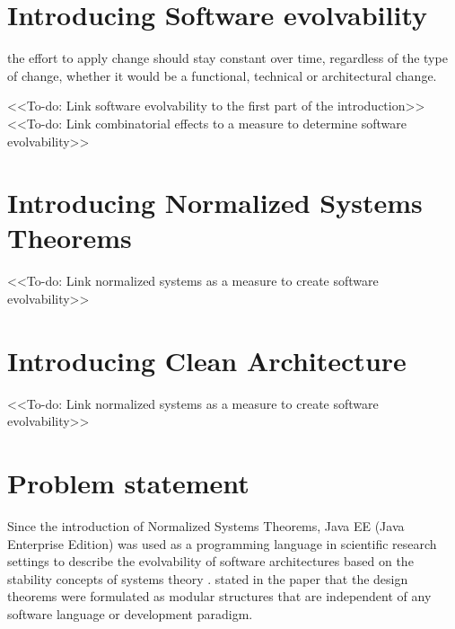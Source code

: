 \section{Introducing Software evolvability}
the effort to apply change should stay constant over time, regardless of the type of change,
whether it would be a functional, technical or architectural change.

<<To-do: Link software evolvability to the first part of the introduction>>\\
<<To-do: Link combinatorial effects to a measure to determine software evolvability>>

\section{Introducing Normalized Systems Theorems}
<<To-do: Link normalized systems as a measure to create software evolvability>>

\section{Introducing Clean Architecture}
<<To-do: Link normalized systems as a measure to create software evolvability>>

\section{Problem statement} \label{problem_statement} 

Since the introduction of Normalized Systems Theorems, Java EE (Java Enterprise Edition)
was used as a programming language in scientific research settings to describe the
evolvability of software architectures based on the stability concepts of systems theory
\parencite[]{mannaert_towards_2012}. \citeauthor{mannaert_towards_2012} stated in the
paper that the design theorems were formulated as modular structures that are independent
of any software language or development paradigm.


